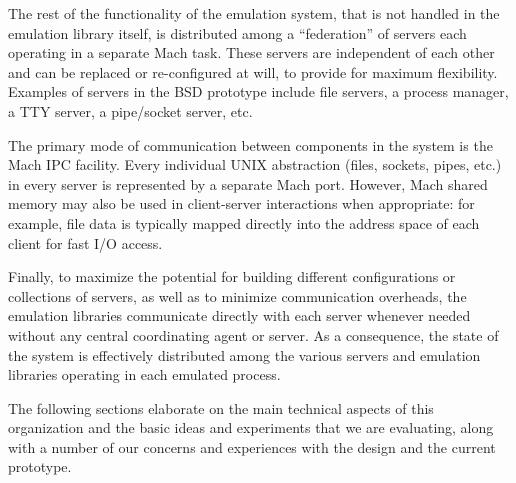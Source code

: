 The rest of the functionality of the emulation system, that is not
handled in the emulation library itself, is distributed among a
``federation'' of servers each operating in a separate Mach task.
These servers are independent of each other and can be replaced or
re-configured at will, to provide for maximum flexibility.  Examples
of servers in the BSD prototype include file servers, a process
manager, a TTY server, a pipe/socket server, etc.

The primary mode of communication between components in the system is
the Mach IPC facility.  Every individual UNIX abstraction (files,
sockets, pipes, etc.) in every server is represented by a separate
Mach port.  However, Mach shared memory may also be used in
client-server interactions when appropriate: for example, file data is
typically mapped directly into the address space of each client for
fast I/O access.

Finally, to maximize the potential for building different
configurations or collections of servers, as well as to minimize
communication overheads, the emulation libraries communicate directly
with each server whenever needed without any central coordinating
agent or server.  As a consequence, the state of the system is
effectively distributed among the various servers and emulation
libraries operating in each emulated process. 


The following sections elaborate on the main technical aspects of this
organization and the basic ideas and experiments that we are
evaluating, along with a number of our concerns and experiences with
the design and the current prototype.



